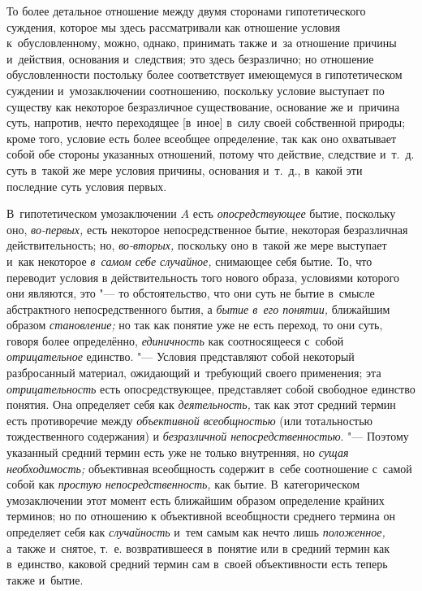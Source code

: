 То более детальное отношение между двумя сторонами
гипотетического суждения, которое мы здесь рассматривали как отношение
условия к~обусловленному, можно, однако, принимать также и~за отношение
причины и~действия, основания и~следствия; это здесь безразлично; но
отношение обусловленности постольку более соответствует имеющемуся в
гипотетическом суждении и~умозаключении соотношению, поскольку условие
выступает по существу как некоторое безразличное существование, основание
же и~причина суть, напротив, нечто переходящее [в~иное] в~силу своей
собственной природы; кроме того, условие есть более всеобщее определение,
так как оно охватывает собой обе стороны указанных отношений, потому что
действие, следствие и~т.~д. суть в~такой же мере условия причины, основания
и~т.~д., в~какой эти последние суть условия первых.

В~гипотетическом умозаключении $A$ есть
{\em опосредствующее} бытие, поскольку оно, {\em во-первых,} есть
некоторое непосредственное бытие, некоторая безразличная действительность;
но, {\em во-вторых,} поскольку оно в~такой же мере выступает и~как некоторое
{\em в~самом себе случайное,}
снимающее себя бытие. То, что переводит условия в
действительность того нового образа, условиями которого они являются, это
"--- то обстоятельство, что они суть не бытие в~смысле
абстрактного непосредственного бытия, а
{\em бытие в~его понятии,} ближайшим образом {\em становление;} но так
как понятие уже не есть переход, то они суть, говоря более определённо,
{\em единичность} как
соотносящееся с~собой {\em отрицательное} единство. "--- Условия
представляют собой некоторый разбросанный материал,
ожидающий и~требующий своего применения; эта {\em отрицательность}
есть опосредствующее, представляет собой свободное единство
понятия. Она определяет себя как {\em деятельность,} так
как этот средний термин есть противоречие между
{\em объективной всеобщностью}
(или тотальностью тождественного содержания) и
{\em безразличной непосредственностью}.
"--- Поэтому указанный средний термин есть уже не только
внутренняя, но {\em сущая необходимость;} объективная всеобщность содержит
в~себе соотношение с~самой собой как {\em простую непосредственность,}
как бытие. В~категорическом умозаключении этот момент есть
ближайшим образом определение крайних терминов; но по отношению к
объективной всеобщности среднего термина он определяет себя как
{\em случайность} и~тем самым как нечто лишь {\em положенное,}
а~также и~снятое, т.~е. возвратившееся в~понятие или в
средний термин как в~единство, каковой средний термин сам в~своей
объективности есть теперь также и~бытие.

